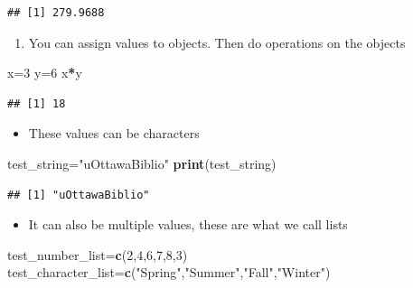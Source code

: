 \documentclass[
]{article}
\newenvironment{Shaded}{\begin{snugshade}}{\end{snugshade}}
\newcommand{\DecValTok}[1]{\textcolor[rgb]{0.00,0.00,0.81}{#1}}
\newcommand{\FunctionTok}[1]{\textcolor[rgb]{0.13,0.29,0.53}{\textbf{#1}}}
\newcommand{\NormalTok}[1]{#1}
\newcommand{\OtherTok}[1]{\textcolor[rgb]{0.56,0.35,0.01}{#1}}
\newcommand{\SpecialCharTok}[1]{\textcolor[rgb]{0.81,0.36,0.00}{\textbf{#1}}}
\newcommand{\StringTok}[1]{\textcolor[rgb]{0.31,0.60,0.02}{#1}}
\providecommand{\tightlist}{%
  \setlength{\itemsep}{0pt}\setlength{\parskip}{0pt}}
\begin{document}
\begin{verbatim}
## [1] 279.9688
\end{verbatim}

\begin{enumerate}
\def\labelenumi{\arabic{enumi}.}
\setcounter{enumi}{1}
\tightlist
\item
  You can assign values to objects. Then do operations on the objects
\end{enumerate}

\begin{Shaded}
\begin{Highlighting}[]
\NormalTok{x}\OtherTok{=}\DecValTok{3} 
\NormalTok{y}\OtherTok{=}\DecValTok{6}
\NormalTok{x}\SpecialCharTok{*}\NormalTok{y}
\end{Highlighting}
\end{Shaded}

\begin{verbatim}
## [1] 18
\end{verbatim}

\begin{itemize}
\tightlist
\item
  These values can be characters
\end{itemize}

\begin{Shaded}
\begin{Highlighting}[]
\NormalTok{test\_string}\OtherTok{=}\StringTok{"uOttawaBiblio"}
\FunctionTok{print}\NormalTok{(test\_string)}
\end{Highlighting}
\end{Shaded}

\begin{verbatim}
## [1] "uOttawaBiblio"
\end{verbatim}

\begin{itemize}
\tightlist
\item
  It can also be multiple values, these are what we call lists
\end{itemize}

\begin{Shaded}
\begin{Highlighting}[]
\NormalTok{test\_number\_list}\OtherTok{=}\FunctionTok{c}\NormalTok{(}\DecValTok{2}\NormalTok{,}\DecValTok{4}\NormalTok{,}\DecValTok{6}\NormalTok{,}\DecValTok{7}\NormalTok{,}\DecValTok{8}\NormalTok{,}\DecValTok{3}\NormalTok{)}
\NormalTok{test\_character\_list}\OtherTok{=}\FunctionTok{c}\NormalTok{(}\StringTok{"Spring"}\NormalTok{,}\StringTok{"Summer"}\NormalTok{,}\StringTok{"Fall"}\NormalTok{,}\StringTok{"Winter"}\NormalTok{)}
\end{Highlighting}
\end{Shaded}
\end{document}
